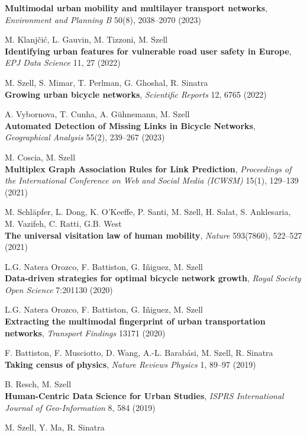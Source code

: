 \documentclass[10pt,a4paper]{article}
\begin{document}
\begin{etaremune}
    \textbf{Multimodal urban mobility and multilayer transport networks}, \textit{Environment and Planning B} 50(8), 2038--2070 (2023)
\item M. Klanjčić, L. Gauvin, M. Tizzoni, M. Szell\\
    \textbf{Identifying urban features for vulnerable road user safety in Europe}, \textit{EPJ Data Science} 11, 27 (2022)
\item M. Szell, S. Mimar, T. Perlman, G. Ghoshal, R. Sinatra\\
    \textbf{Growing urban bicycle networks}, \textit{Scientific Reports} 12, 6765 (2022)
\item A. Vybornova, T. Cunha, A. Gühnemann, M. Szell\\
    \textbf{Automated Detection of Missing Links in Bicycle Networks}, \textit{Geographical Analysis} 55(2), 239--267 (2023)
\item M. Coscia, M. Szell\\
    \textbf{Multiplex Graph Association Rules for Link Prediction}, \textit{Proceedings of the International Conference on Web and Social Media (ICWSM)} 15(1), 129--139 (2021)
\item M. Schläpfer, L. Dong, K. O'Keeffe, P. Santi, M. Szell, H. Salat, S. Anklesaria, M. Vazifeh, C. Ratti, G.B. West\\
    \textbf{The universal visitation law of human mobility}, \textit{Nature} 593(7860), 522--527 (2021)
\item L.G. Natera Orozco, F. Battiston, G. I{\~n}iguez, M. Szell\\
    \textbf{Data-driven strategies for optimal bicycle network growth}, \textit{Royal Society Open Science} 7:201130 (2020)
\item L.G. Natera Orozco, F. Battiston, G. Iñiguez, M. Szell\\
    \textbf{Extracting the multimodal fingerprint of urban transportation networks}, \textit{Transport Findings} 13171 (2020)
\item F. Battiston, F. Musciotto, D. Wang, A.-L. Barab\'asi, M. Szell, R. Sinatra\\
    \textbf{Taking census of physics}, \textit{Nature Reviews Physics} 1, 89--97 (2019)
\item B. Resch, M. Szell\\
    \textbf{Human-Centric Data Science for Urban Studies}, \textit{ISPRS International Journal of Geo-Information}  8, 584 (2019)
\item M. Szell, Y. Ma, R. Sinatra\\

\end{etaremune}
\end{document}
